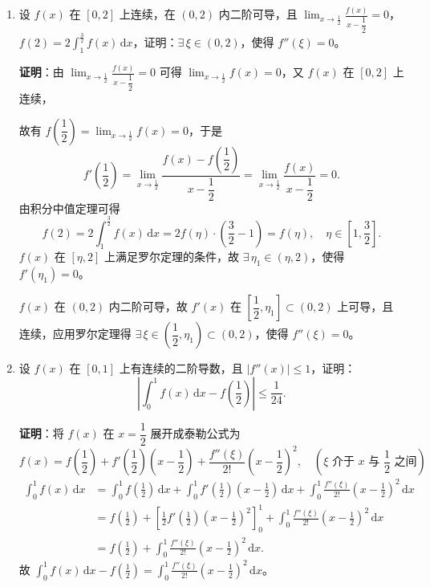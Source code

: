 \documentclass[a4paper,11pt]{ctexart}
\newcommand{\dd}{\,\mathrm{d}}
\begin{document}
\begin{enumerate}[label=\arabic*., start=19, leftmargin=2em, itemsep=0.9em, topsep=0.45em]
  \item 设 $f(x)$ 在 $[0,2]$ 上连续，在 $(0,2)$ 内二阶可导，且 $\displaystyle\lim_{x\to\frac{1}{2}}\frac{f(x)}{x-\dfrac{1}{2}}=0$，$f(2)=2\displaystyle\int_1^{\frac{3}{2}}f(x)\dd x$，证明：$\exists\,\xi\in(0,2)$，使得 $f''(\xi)=0$。

  \textbf{证明}：由 $\displaystyle\lim_{x\to\frac{1}{2}}\frac{f(x)}{x-\dfrac{1}{2}}=0$ 可得 $\displaystyle\lim_{x\to\frac{1}{2}}f(x)=0$，又 $f(x)$ 在 $[0,2]$ 上连续，

  故有 $f\!\left(\dfrac{1}{2}\right)=\displaystyle\lim_{x\to\frac{1}{2}}f(x)=0$，于是
  \[
    f'\!\left(\frac{1}{2}\right)=\lim_{x\to\frac{1}{2}}\frac{f(x)-f\!\left(\dfrac{1}{2}\right)}{x-\dfrac{1}{2}}=\lim_{x\to\frac{1}{2}}\frac{f(x)}{x-\dfrac{1}{2}}=0.
  \]
  由积分中值定理可得
  \[
    f(2)=2\int_1^{\frac{3}{2}}f(x)\dd x=2f(\eta)\cdot\left(\frac{3}{2}-1\right)=f(\eta),\quad \eta\in\left[1,\frac{3}{2}\right].
  \]
  $f(x)$ 在 $[\eta,2]$ 上满足罗尔定理的条件，故 $\exists\,\eta_1\in(\eta,2)$，使得 $f'(\eta_1)=0$。

  $f(x)$ 在 $(0,2)$ 内二阶可导，故 $f'(x)$ 在 $\left[\dfrac{1}{2},\eta_1\right]\subset(0,2)$ 上可导，且连续，应用罗尔定理得 $\exists\,\xi\in\left(\dfrac{1}{2},\eta_1\right)\subset(0,2)$，使得 $f''(\xi)=0$。

  \item 设 $f(x)$ 在 $[0,1]$ 上有连续的二阶导数，且 $|f''(x)|\le 1$，证明：
  \[
    \left|\int_0^1 f(x)\dd x - f\!\left(\frac{1}{2}\right)\right|\le\frac{1}{24}.
  \]

  \textbf{证明}：将 $f(x)$ 在 $x=\dfrac{1}{2}$ 展开成泰勒公式为
  \[
    f(x)=f\!\left(\frac{1}{2}\right)+f'\!\left(\frac{1}{2}\right)\left(x-\frac{1}{2}\right)+\frac{f''(\xi)}{2!}\left(x-\frac{1}{2}\right)^2,\quad \left(\xi\text{ 介于 }x\text{ 与 }\frac{1}{2}\text{ 之间}\right)
  \]
  \begin{align*}
    \int_0^1 f(x)\dd x &= \int_0^1 f\!\left(\frac{1}{2}\right)\dd x+\int_0^1 f'\!\left(\frac{1}{2}\right)\left(x-\frac{1}{2}\right)\dd x+\int_0^1\frac{f''(\xi)}{2!}\left(x-\frac{1}{2}\right)^2\dd x \\
    &= f\!\left(\frac{1}{2}\right)+\left[\frac{1}{2}f'\!\left(\frac{1}{2}\right)\left(x-\frac{1}{2}\right)^2\right]_0^1+\int_0^1\frac{f''(\xi)}{2!}\left(x-\frac{1}{2}\right)^2\dd x \\
    &= f\!\left(\frac{1}{2}\right)+\int_0^1\frac{f''(\xi)}{2!}\left(x-\frac{1}{2}\right)^2\dd x.
  \end{align*}
  故 $\displaystyle\int_0^1 f(x)\dd x - f\!\left(\frac{1}{2}\right) = \int_0^1\frac{f''(\xi)}{2!}\left(x-\frac{1}{2}\right)^2\dd x$。


\end{enumerate}
\end{document}
